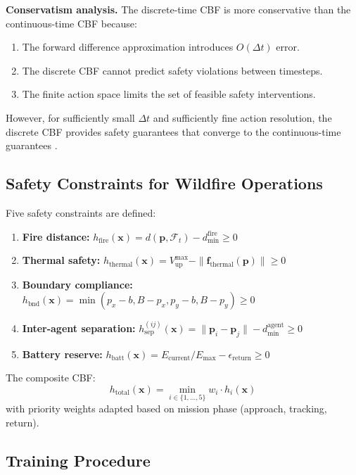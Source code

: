 \documentclass[12pt,a4paper]{article}
\DeclareRobustCommand{\cF}{\mathcal{F}}
\DeclareRobustCommand{\vect}[1]{\bm{#1}}
\begin{document}
\textbf{Conservatism analysis.} The discrete-time CBF is more conservative than the continuous-time CBF because:
\begin{enumerate}[leftmargin=*]
    \item The forward difference approximation introduces $O(\Delta t)$ error.
    \item The discrete CBF cannot predict safety violations between timesteps.
    \item The finite action space limits the set of feasible safety interventions.
\end{enumerate}
However, for sufficiently small $\Delta t$ and sufficiently fine action resolution, the discrete CBF provides safety guarantees that converge to the continuous-time guarantees \cite{Ames2019}.

\subsection{Safety Constraints for Wildfire Operations}

Five safety constraints are defined:
\begin{enumerate}[leftmargin=*, label=\textbf{S\arabic*}]
    \item \textbf{Fire distance:} $h_{\text{fire}}(\vect{x}) = d(\vect{p}, \cF_t) - d_{\min}^{\text{fire}} \geq 0$
    \item \textbf{Thermal safety:} $h_{\text{thermal}}(\vect{x}) = V_{\text{up}}^{\max} - \|\vect{f}_{\text{thermal}}(\vect{p})\| \geq 0$
    \item \textbf{Boundary compliance:} $h_{\text{bnd}}(\vect{x}) = \min(p_x - b, B - p_x, p_y - b, B - p_y) \geq 0$
    \item \textbf{Inter-agent separation:} $h_{\text{sep}}^{(ij)}(\vect{x}) = \|\vect{p}_i - \vect{p}_j\| - d_{\min}^{\text{agent}} \geq 0$
    \item \textbf{Battery reserve:} $h_{\text{batt}}(\vect{x}) = E_{\text{current}} / E_{\max} - \epsilon_{\text{return}} \geq 0$
\end{enumerate}

The composite CBF:
\begin{equation}
    h_{\text{total}}(\vect{x}) = \min_{i \in \{1,\ldots,5\}} w_i \cdot h_i(\vect{x})
    \label{eq:composite_cbf}
\end{equation}
with priority weights adapted based on mission phase (approach, tracking, return).

\subsection{Training Procedure}
\end{document}
